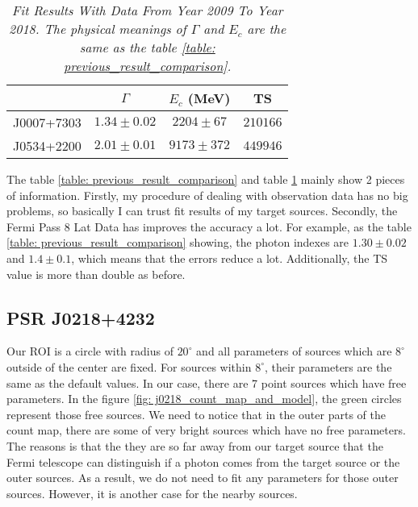 \documentclass[12pt]{report}
\newcommand{\mycaption}[1]{\caption{\textit{\footnotesize #1}}}
\begin{document}
            \begin{table}[!ht]
              \centering
              \begin{tabular}{|c|c|c|c|}
                \hline 
                &$\Gamma$& $E_c$ (MeV) & TS \\ \hline 
                J0007+7303 & $1.34\pm0.02$ & $2204\pm67$ & $210166$ \\ \hline 
                J0534+2200 & $2.01\pm0.01$ & $9173\pm372$ & $449946$ \\ \hline
              \end{tabular}
              \mycaption{Fit Results With Data From Year 2009 To Year 2018. The physical meanings of 
              $\Gamma$ and $E_c$ are the same as the table \ref{table: previous_result_comparison}.}
              \label{table: 2018_fit_data}
            \end{table}
            \vspace{1cm}            
            The table \ref{table: previous_result_comparison} and table \ref{table: 2018_fit_data} mainly 
            show 2 pieces of information. Firstly, my procedure of dealing with observation data has no
            big problems, so basically I can trust fit results of my target sources. Secondly, the Fermi 
            Pass 8 Lat Data has improves the accuracy a lot. For example, as the table 
            \ref{table: previous_result_comparison} showing, the photon indexes are 
            $1.30\pm0.02$ and $1.4\pm0.1$, which means that the errors reduce a lot. Additionally, the TS 
            value is more than double as before. 

        \subsection{PSR J0218+4232}
          \label{j0218}
          Our ROI is a circle with radius of $20^\circ$ and all parameters of sources which are $8^\circ$ outside 
          of the center are fixed. For sources within $8^\circ$, their parameters are the same as the default values. 
          In our case, there are 7 point sources which have free parameters. In the figure 
          \ref{fig: j0218_count_map_and_model}, the green circles represent those free sources. We need to notice 
          that in the outer parts of the count map, there are some of very 
          bright sources which have no free parameters. The reasons is that the they are so far away from our target source
          that the Fermi telescope can distinguish if a photon comes from the target source or the outer sources.
          As a result, we do not need to fit any parameters for those outer sources. 
          However, it is another case for the nearby sources. 
          
\end{document}
